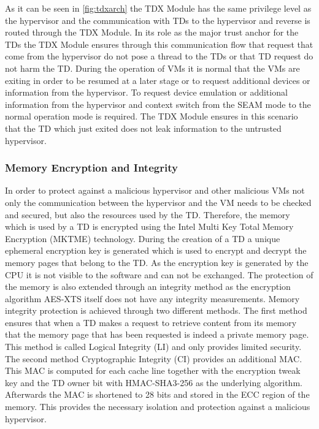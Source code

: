 \documentclass[sigplan,screen,nonacm]{acmart}
\begin{document}
As it can be seen in \cref{fig:tdxarch} the TDX Module has the same privilege level as the hypervisor and the communication with TDs to the hypervisor and reverse is routed through the TDX Module.
In its role as the major trust anchor for the TDs the TDX Module ensures through this communication flow that request that come from the hypervisor do not pose a thread to the TDs or that TD request do not harm the TD.
During the operation of VMs it is normal that the VMs are exiting in order to be resumed at a later stage or to request additional devices or information from the hypervisor.
To request device emulation or additional information from the hypervisor and context switch from the SEAM mode to the normal operation mode is required.
The TDX Module ensures in this scenario that the TD which just exited does not leak information to the untrusted hypervisor.

\subsubsection{Memory Encryption and Integrity}

In order to protect against a malicious hypervisor and other malicious VMs not only the communication between the hypervisor and the VM needs to be checked and secured, but also the resources used by the TD.
Therefore, the memory which is used by a TD is encrypted using the Intel Multi Key Total Memory Encryption (MKTME) technology.
During the creation of a TD a unique ephemeral encryption key is generated which is used to encrypt and decrypt the memory pages that belong to the TD.
As the encryption key is generated by the CPU it is not visible to the software and can not be exchanged\cite{Intel-MKTME}.
The protection of the memory is also extended through an integrity method as the encryption algorithm AES-XTS itself does not have any integrity measurements.
Memory integrity protection is achieved through two different methods.
The first method ensures that when a TD makes a request to retrieve content from its memory that the memory page that has been requested is indeed a private memory page.
This method is called Logical Integrity (LI) and only provides limited security\cite[p. 120]{Intel-TDX-Module-Specs}.
The second method Cryptographic Integrity (CI) provides an additional MAC.
This MAC is computed for each cache line together with the encryption tweak key and the TD owner bit with HMAC-SHA3-256 as the underlying algorithm\cite[p. 3]{Intel-TDX-Whitepaper}.
Afterwards the MAC is shortened to 28 bits and stored in the ECC region of the memory.
This provides the necessary isolation and protection against a malicious hypervisor.
\end{document}
